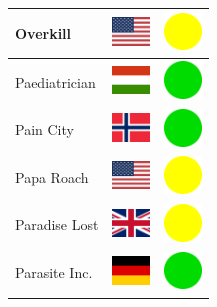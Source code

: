 \documentclass[12pt, a4paper, twoside]{report}
\begin{document}
\begin{center}
\begin{longtable}{|p{5cm}|p{2cm}|p{2cm}|}
 Overkill                                                   & \includegraphics[width=1cm]{../img/flags/us} &   \includegraphics[width=1cm]{../likes/m} \\ \hline
 Paediatrician                                              & \includegraphics[width=1cm]{../img/flags/hu} &   \includegraphics[width=1cm]{../likes/y} \\ \hline
 Pain City                                                  & \includegraphics[width=1cm]{../img/flags/no} &   \includegraphics[width=1cm]{../likes/y} \\ \hline
 Papa Roach                                                 & \includegraphics[width=1cm]{../img/flags/us} &   \includegraphics[width=1cm]{../likes/m} \\ \hline
 Paradise Lost                                              & \includegraphics[width=1cm]{../img/flags/gb} &   \includegraphics[width=1cm]{../likes/m} \\ \hline
 Parasite Inc.                                              & \includegraphics[width=1cm]{../img/flags/de} &   \includegraphics[width=1cm]{../likes/y} \\ \hline

\end{longtable}
\end{center}
\end{document}
